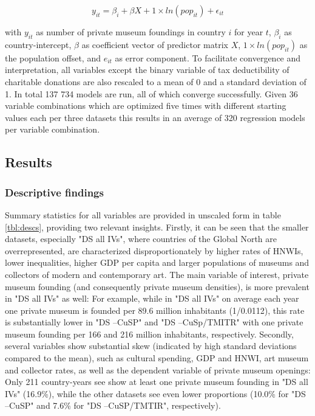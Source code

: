 \documentclass[11pt]{article}
\begin{document}
\begin{equation*}
y_{it} = \beta_i + \beta X + 1 \times ln(pop_{it}) + \epsilon_{it}
\end{equation*}

with \(y_{it}\) as number of private museum foundings in country \(i\) for year \(t\), \(\beta_i\) as country-intercept, \(\beta\) as coefficient vector of predictor matrix \(X\), \(1 \times ln(pop_{it})\) as the population offset, and \(e_{it}\) as error component.
To facilitate convergence and interpretation, all variables except the binary variable of tax deductibility of charitable donations are also rescaled to a mean of 0 and a standard deviation of 1. 
In total 137 734 models are run, all of which converge successfully. 
Given 36 variable combinations which are optimized five times with different starting values each per three datasets this results in an average of 320 regression models per variable combination.


\subsection*{Results}


\subsubsection*{Descriptive findings}


Summary statistics for all variables are provided in unscaled form in table \ref{tbl:descs}, providing two relevant insights. 
Firstly, it can be seen that the smaller datasets, especially "DS all IVs", where countries of the Global North are overrepresented, are characterized disproportionately by higher rates of HNWIs, lower inequalities, higher GDP per capita and larger populations of museums and collectors of modern and contemporary art.
The main variable of interest, private museum founding (and consequently private museum densities), is more prevalent in "DS all IVs" as well: 
For example, while in "DS all IVs" on average each year one private museum is founded per 89.6 million inhabitants (1/0.0112), this rate is substantially lower in "DS --CuSP" and "DS --CuSp/TMITR" with one private museum founding per 166 and 216 million inhabitants, respectively.
Secondly, several variables show substantial skew (indicated by high standard deviations compared to the mean), such as cultural spending, GDP and HNWI, art museum and collector rates, as well as the dependent variable of private museum openings: 
Only 211 country-years see show at least one private museum founding in "DS all IVs" (16.9\%), while the other datasets see even lower proportions (10.0\% for "DS --CuSP" and 7.6\% for "DS --CuSP/TMTIR", respectively).
\end{document}
